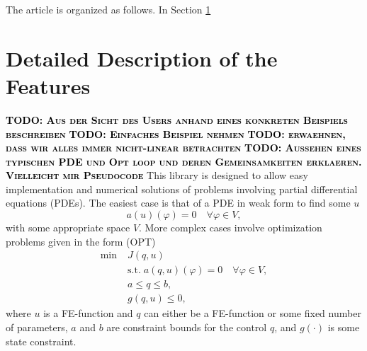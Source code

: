 \documentclass[prodmode,acmtoms]{acmsmall}
\numberwithin{equation}{section}
\renewcommand{\phi}{\varphi}
\newcommand{\todo}[1]{\textbf{\textsc{\textcolor{black}{TODO: #1}}}}
\begin{document}
The article is organized as follows. In Section
\ref{detailed_description} 
 
%
%
%



\section{Detailed Description of the Features}
\label{detailed_description}
\todo{Aus der Sicht des Users anhand eines konkreten Beispiels beschreiben}
\todo{Einfaches Beispiel nehmen}
\todo{erwaehnen, dass wir alles immer nicht-linear betrachten}
\todo{Aussehen eines typischen PDE und Opt loop und deren Gemeinsamkeiten
erklaeren. Vielleicht mir Pseudocode}
This library is designed to allow easy implementation and numerical solutions 
of problems involving partial differential equations (PDEs). The easiest case 
is that of a PDE in weak form to find some $u$
\[
a(u)(\phi) = 0 \quad \forall \phi \in V,
\]
with some appropriate space $V$.
More complex cases involve optimization problems given in the form (OPT)
\begin{align*}
\min\;&J(q,u) \\
  &\text{s.t.}\; a(q,u)(\phi) = 0 \quad \forall \phi\in V,\\
  &a \le q \le b,\\
  &g(q,u) \le 0,  
\end{align*}
where $u$ is a FE-function and $q$ can either be a FE-function or some 
fixed number of parameters, $a$ and $b$ are constraint bounds for the control $q$,
and $g(\cdot)$ is some state constraint.
\end{document}
